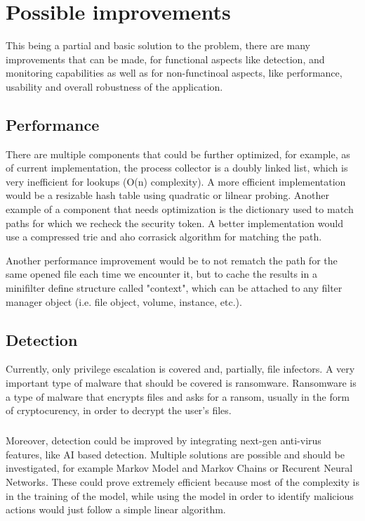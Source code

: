 \chapter{Possible improvements}
    This being a partial and basic solution to the problem, there are many improvements that can be made, for functional aspects like detection,
    and monitoring capabilities as well as for non-functinoal aspects, like performance, usability and overall robustness of the application.

    \section{Performance}
        There are multiple components that could be further optimized, for example, as of current implementation, the process collector is
        a doubly linked list, which is very inefficient for lookups (O(n) complexity). A more efficient implementation would be a resizable hash
        table using quadratic or lilnear probing. Another example of a component that needs optimization is the dictionary used to match paths
        for which we recheck the security token. A better implementation would use a compressed trie and aho corrasick algorithm for matching
        the path.

        Another performance improvement would be to not rematch the path for the same opened file each time we encounter it, but to cache
        the results in a minifilter define structure called "context", which can be attached to any filter manager object (i.e. file object, 
        volume, instance, etc.).

    \section{Detection}
        Currently, only privilege escalation is covered and, partially, file infectors. A very important type of malware that should be covered
        is ransomware. Ransomware is a type of malware that encrypts files and asks for a ransom, usually in the form of cryptocurency, in order
        to decrypt the user's files.

        \paragraph{}
        Moreover, detection could be improved by integrating next-gen anti-virus features, like AI based detection. Multiple solutions are
        possible and should be investigated, for example Markov Model and Markov Chains or Recurent Neural Networks. These could prove extremely
        efficient because most of the complexity is in the training of the model, while using the model in order to identify malicious actions
        would just follow a simple linear algorithm.

